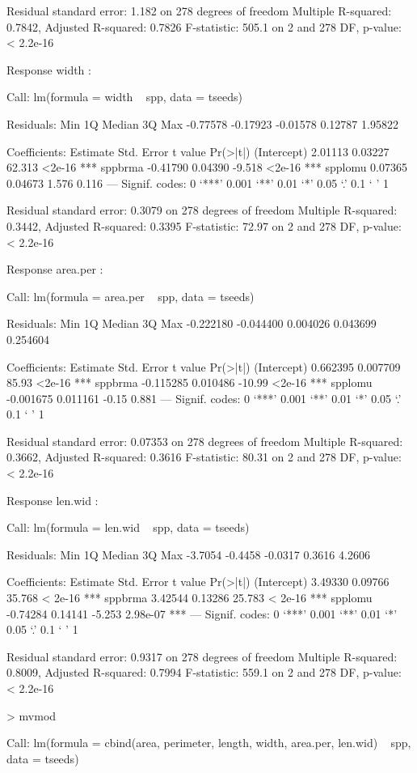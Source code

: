 \documentclass{article}
\begin{document}
\begin{Schunk}
\begin{Soutput}
Residual standard error: 1.182 on 278 degrees of freedom
Multiple R-squared:  0.7842,	Adjusted R-squared:  0.7826 
F-statistic: 505.1 on 2 and 278 DF,  p-value: < 2.2e-16


Response width :

Call:
lm(formula = width ~ spp, data = tseeds)

Residuals:
     Min       1Q   Median       3Q      Max 
-0.77578 -0.17923 -0.01578  0.12787  1.95822 

Coefficients:
            Estimate Std. Error t value Pr(>|t|)    
(Intercept)  2.01113    0.03227  62.313   <2e-16 ***
sppbrma     -0.41790    0.04390  -9.518   <2e-16 ***
spplomu      0.07365    0.04673   1.576    0.116    
---
Signif. codes:  0 ‘***’ 0.001 ‘**’ 0.01 ‘*’ 0.05 ‘.’ 0.1 ‘ ’ 1

Residual standard error: 0.3079 on 278 degrees of freedom
Multiple R-squared:  0.3442,	Adjusted R-squared:  0.3395 
F-statistic: 72.97 on 2 and 278 DF,  p-value: < 2.2e-16


Response area.per :

Call:
lm(formula = area.per ~ spp, data = tseeds)

Residuals:
      Min        1Q    Median        3Q       Max 
-0.222180 -0.044400  0.004026  0.043699  0.254604 

Coefficients:
             Estimate Std. Error t value Pr(>|t|)    
(Intercept)  0.662395   0.007709   85.93   <2e-16 ***
sppbrma     -0.115285   0.010486  -10.99   <2e-16 ***
spplomu     -0.001675   0.011161   -0.15    0.881    
---
Signif. codes:  0 ‘***’ 0.001 ‘**’ 0.01 ‘*’ 0.05 ‘.’ 0.1 ‘ ’ 1

Residual standard error: 0.07353 on 278 degrees of freedom
Multiple R-squared:  0.3662,	Adjusted R-squared:  0.3616 
F-statistic: 80.31 on 2 and 278 DF,  p-value: < 2.2e-16


Response len.wid :

Call:
lm(formula = len.wid ~ spp, data = tseeds)

Residuals:
    Min      1Q  Median      3Q     Max 
-3.7054 -0.4458 -0.0317  0.3616  4.2606 

Coefficients:
            Estimate Std. Error t value Pr(>|t|)    
(Intercept)  3.49330    0.09766  35.768  < 2e-16 ***
sppbrma      3.42544    0.13286  25.783  < 2e-16 ***
spplomu     -0.74284    0.14141  -5.253 2.98e-07 ***
---
Signif. codes:  0 ‘***’ 0.001 ‘**’ 0.01 ‘*’ 0.05 ‘.’ 0.1 ‘ ’ 1

Residual standard error: 0.9317 on 278 degrees of freedom
Multiple R-squared:  0.8009,	Adjusted R-squared:  0.7994 
F-statistic: 559.1 on 2 and 278 DF,  p-value: < 2.2e-16
\end{Soutput}
\begin{Sinput}
> mvmod
\end{Sinput}
\begin{Soutput}
Call:
lm(formula = cbind(area, perimeter, length, width, area.per, 
    len.wid) ~ spp, data = tseeds)


\end{Soutput}
\end{Schunk}
\end{document}
